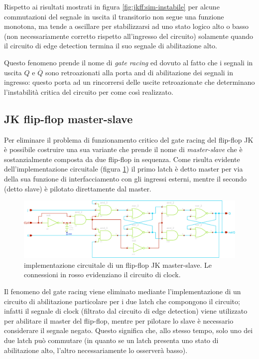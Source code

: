 	Rispetto ai risultati mostrati in figura \ref{fig:jkff:sim-instabile} per alcune commutazioni del segnale in uscita il transitorio non segue una funzione monotona, ma tende a oscillare per stabilizzarsi ad uno stato logico alto o basso (non necessariamente corretto rispetto all'ingresso del circuito) solamente quando il circuito di edge detection termina il suo segnale di abilitazione alto.
	
	Questo fenomeno prende il nome di \textit{gate racing} ed dovuto al fatto che i segnali in uscita $Q$ e $\overline Q$ sono retroazionati alla porta and di abilitazione dei segnali in ingresso: questo porta ad un rincorrersi delle uscite retroazionate che determinano l'instabilità critica del circuito per come così realizzato.
	
\subsection*{JK flip-flop master-slave}
	
	Per eliminare il problema di funzionamento critico del gate racing del flip-flop JK è possibile costruire una sua variante che prende il nome di \textit{master-slave} che è sostanzialmente composta da due flip-flop in sequenza. Come risulta evidente dell'implementazione circuitale (figura \ref{fig:jkff:masterslave}) il primo latch è detto master per via della sua funzione di interfacciamento con gli ingressi esterni, mentre il secondo (detto slave) è pilotato direttamente dal master.
	
	\begin{figure}[bht]
		\centering
		\includegraphics[width=12cm]{Immagini/jk-masterslave}
		\caption{implementazione circuitale di un flip-flop JK master-slave. Le connessioni in rosso evidenziano il circuito di clock.}
		\label{fig:jkff:masterslave}
	\end{figure}
	
	Il fenomeno del gate racing viene eliminato mediante l'implementazione di un circuito di abilitazione particolare per i due latch che compongono il circuito; infatti il segnale di clock (filtrato dal circuito di edge detection) viene utilizzato per abilitare il master del flip-flop, mentre per pilotare lo slave è necessario considerare il segnale negato. Questo significa che, allo stesso tempo, solo uno dei due latch può commutare (in quanto se un latch presenta uno stato di abilitazione alto, l'altro necessariamente lo osserverà basso).
	
